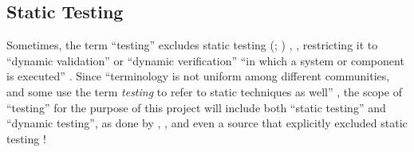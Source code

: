     \subsection{Static Testing}
    \label{static-test}
    Sometimes, the term ``testing'' excludes static testing
    \ifnotpaper
        (\citealp[p.~222]{AmmannAndOffutt2017}; \citealp[p.~13]{Firesmith2015})%
    \else
        \cite[p.~222]{AmmannAndOffutt2017}, \cite[p.~13]{Firesmith2015}%
    \fi, restricting it to ``dynamic validation'' \citep[p.~5-1]{SWEBOK2024} or
    ``dynamic verification'' ``in which a system or component is
    executed'' \citep[p.~427]{IEEE2017}. Since ``terminology is not uniform
    among different communities, and some use the term \emph{testing} to refer to
    static techniques as well''
    \citep[p.~5-2]{SWEBOK2024}, the scope of ``testing'' for the purpose of this
    project will include both ``static testing'' and ``dynamic testing'', as
    done by \citet[p.~17]{IEEE2022}, \citet[pp.~8-9]{Gerrard2000a}, and even a
    source that explicitly excluded static testing \citep[p.~440]{IEEE2017}!




